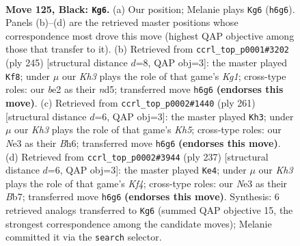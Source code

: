 \documentclass[11pt]{article}
\begin{document}
\clearpage

\begin{figure}[p]\centering
\begin{subfigure}{0.46\textwidth}\centering
\resizebox{\linewidth}{!}{%
\newchessgame
\chessboard[
  setfen={8/8/7k/6p1/8/4n2K/4B3/8 b - - 8 125},
  showmover=false,
  pgfstyle=straightmove, color=movearrow, markmove={h6-g6}
]}
\caption{}
\end{subfigure}\hfill
\begin{subfigure}{0.46\textwidth}\centering
\resizebox{\linewidth}{!}{%
\newchessgame
\chessboard[
  setfen={6k1/6p1/8/3N2P1/8/5K2/8/3n4 b - - 0 123},
  showmover=false,
  pgfstyle=straightmove, color=movearrow, markmove={g8-f8}
]}
\caption{}
\end{subfigure}
\\[4pt]
\begin{subfigure}{0.46\textwidth}\centering
\resizebox{\linewidth}{!}{%
\newchessgame
\chessboard[
  setfen={8/8/2B4b/8/3p2pk/8/4K3/8 b - - 55 131},
  showmover=false,
  pgfstyle=straightmove, color=movearrow, markmove={h4-h3}
]}
\caption{}
\end{subfigure}\hfill
\begin{subfigure}{0.46\textwidth}\centering
\resizebox{\linewidth}{!}{%
\newchessgame
\chessboard[
  setfen={8/1b6/8/5k1p/5p1B/8/8/6K1 b - - 85 119},
  showmover=false,
  pgfstyle=straightmove, color=movearrow, markmove={f5-e4}
]}
\caption{}
\end{subfigure}
\caption{\textbf{Move 125, Black: \texttt{Kg6}.} (a) Our position; Melanie plays \texttt{Kg6} (\texttt{h6g6}). Panels (b)--(d) are the retrieved master positions whose correspondence most drove this move (highest QAP objective among those that transfer to it). (b) Retrieved from \texttt{ccrl\_top\_p0001\#3202} (ply 245) [structural distance $d$=8, QAP obj=3]: the master played \texttt{Kf8}; under $\mu$ our \emph{Kh3} plays the role of that game's \emph{Kg1}; cross-type roles: our \emph{b}e2 as their \emph{n}d5; transferred move \texttt{h6g6} \textbf{(endorses this move)}. (c) Retrieved from \texttt{ccrl\_top\_p0002\#1440} (ply 261) [structural distance $d$=6, QAP obj=3]: the master played \texttt{Kh3}; under $\mu$ our \emph{Kh3} plays the role of that game's \emph{Kh5}; cross-type roles: our \emph{N}e3 as their \emph{B}h6; transferred move \texttt{h6g6} \textbf{(endorses this move)}. (d) Retrieved from \texttt{ccrl\_top\_p0002\#3944} (ply 237) [structural distance $d$=6, QAP obj=3]: the master played \texttt{Ke4}; under $\mu$ our \emph{Kh3} plays the role of that game's \emph{Kf4}; cross-type roles: our \emph{N}e3 as their \emph{B}b7; transferred move \texttt{h6g6} \textbf{(endorses this move)}. Synthesis: 6 retrieved analogs transferred to \texttt{Kg6} (summed QAP objective 15, the strongest correspondence among the candidate moves); Melanie committed it via the \texttt{search} selector.}
\label{fig:thought-m249}
\end{figure}
\end{document}
